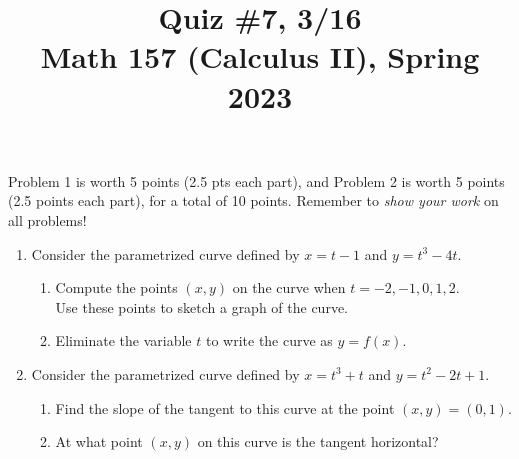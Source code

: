 \documentclass[11pt]{article}
\title{Quiz \#7, 3/16\\ Math 157 (Calculus II), Spring 2023}
\date{}
\begin{document}
\maketitle

\thispagestyle{empty}

\vspace{-2cm}

Problem 1 is worth 5 points (2.5 pts each part), and Problem 2 is worth 5 points (2.5 points each part), for a total of 10 points. Remember to \emph{show your work} on all problems!

\begin{enumerate}
\item Consider the parametrized curve defined by $x = t-1$ and $y=t^3-4t$.
\begin{enumerate}
\item Compute the points $(x,y)$ on the curve when $t=-2, -1, 0, 1, 2$. \\ Use these points to sketch a graph of the curve.
\item Eliminate the variable $t$ to write the curve as $y=f(x)$.
\end{enumerate}

\vspace{3.15in}

\item Consider the parametrized curve defined by $x = t^3+t$ and $y=t^2-2t+1$.
\begin{enumerate}
\item Find the slope of the tangent to this curve at the point $(x,y) = (0,1)$.
\item At what point $(x,y)$ on this curve is the tangent horizontal?
\end{enumerate}

\end{enumerate}
\end{document}
